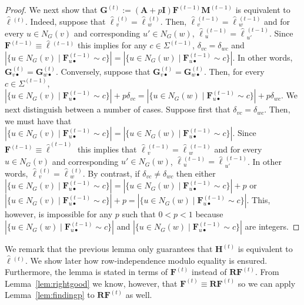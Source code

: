 \begin{proof}
We next show that $\mathbf{G}^{(t)}:=(\mathbf{A}+p\mathbf{I})\mathbf{F}^{(t-1)}\mathbf{M}^{(t-1)}$ is equivalent to $\hat{\pmb{\ell}}{}^{(t)}$. Indeed, suppose that 
$\hat{\pmb{\ell}}{}^{(t)}_v=\hat{\pmb{\ell}}{}^{(t)}_w$. Then,
$\hat{\pmb{\ell}}{}^{(t-1)}_v=\hat{\pmb{\ell}}{}^{(t-1)}_w$ and for every $u\in N_G(v)$ and corresponding $u'\in N_G(w)$, $\hat{\pmb{\ell}}{}^{(t-1)}_u=\hat{\pmb{\ell}}{}^{(t-1)}_{u'}$. Since $\mathbf{F}^{(t-1)}\equiv\hat{\pmb{\ell}}{}^{(t-1)}$ this implies for any $c\in \Sigma^{(t-1)}$,
 $\delta_{vc}=\delta_{wc}$ and 
$|\{u\in N_G(v)\mid \mathbf{F}^{(t-1)}_{u\bullet}\sim c\}|=
|\{u\in N_G(w)\mid \mathbf{F}^{(t-1)}_{u\bullet}\sim c\}|$. In other words,
$\mathbf{G}^{(t)}_{v\bullet}=\mathbf{G}^{(t)}_{w\bullet}$. Conversely,
suppose that $\mathbf{G}^{(t)}_{v\bullet}=\mathbf{G}^{(t)}_{w\bullet}$. Then, for every $c\in \Sigma^{(t-1)}$,
$|\{u\in N_G(v)\mid \mathbf{F}^{(t-1)}_{u\bullet}\sim c\}|+p\delta_{vc}=
|\{u\in N_G(w)\mid \mathbf{F}^{(t-1)}_{u\bullet}\sim c\}|+p\delta_{wc}$. We next distinguish between a number of cases. Suppose first that $\delta_{vc}=\delta_{wc}$. Then, we must have that $|\{u\in N_G(v)\mid \mathbf{F}^{(t-1)}_{u\bullet}\sim c\}|=
|\{u\in N_G(w)\mid \mathbf{F}^{(t-1)}_{u\bullet}\sim c\}|$. Since $\mathbf{F}^{(t-1)}\equiv\hat{\pmb{\ell}}^{(t-1)}$ this implies that $\hat{\pmb{\ell}}{}^{(t-1)}_v=\hat{\pmb{\ell}}{}^{(t-1)}_w$ and for every $u\in N_G(v)$ and corresponding $u'\in N_G(w)$, $\hat{\pmb{\ell}}{}^{(t-1)}_u=\hat{\pmb{\ell}}{}^{(t-1)}_{u'}$. In other words, 
$\hat{\pmb{\ell}}{}^{(t)}_v=\hat{\pmb{\ell}}{}^{(t)}_w$. By contrast, if $\delta_{vc}\neq \delta_{wc}$ then either $|\{u\in N_G(v)\mid \mathbf{F}^{(t-1)}_{u\bullet}\sim c\}|=
|\{u\in N_G(w)\mid \mathbf{F}^{(t-1)}_{u\bullet}\sim c\}|+p$ or
$|\{u\in N_G(v)\mid \mathbf{F}^{(t-1)}_{u\bullet}\sim c\}|+p=
|\{u\in N_G(w)\mid \mathbf{F}^{(t-1)}_{u\bullet}\sim c\}|$. This, however, is impossible for any $p$ such that $0<p<1$ because  $|\{u\in N_G(w)\mid \mathbf{F}^{(t-1)}_{u\bullet}\sim c\}|$ and $|\{u\in N_G(w)\mid \mathbf{F}^{(t-1)}_{u\bullet}\sim c\}|$ are integers.
\end{proof}


We remark that the previous lemma only guarantees that $\mathbf{H}^{(t)}$ is equivalent to $\hat{\pmb{\ell}}{}^{(t)}$. We show later how row-independence modulo equality is ensured.
Furthermore, the lemma is stated in terms of $\mathbf{F}^{(t)}$ instead of $\mathbf{R}\mathbf{F}^{(t)}$.
From Lemma~\ref{lem:rightgood} we know, however, that $\mathbf{F}^{(t)}\equiv\mathbf{R}\mathbf{F}^{(t)}$
so we can apply Lemma~\ref{lem:findingp} to $\mathbf{R}\mathbf{F}^{(t)}$ as well.

